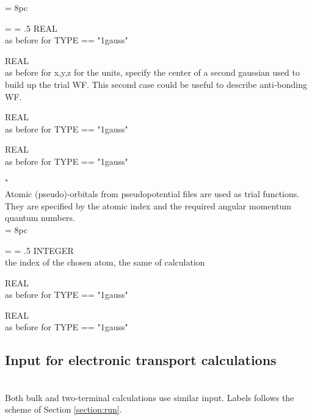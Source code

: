 \newdimen\descindent \descindent = 8pc
{\noindent \leftskip = \descindent \parskip = .5\baselineskip
{}%
REAL \\ as before for TYPE == "1gauss" \par

\noindent{}%
REAL \\ as before for x,y,z for the units, specify the center of a second gaussian
            used to build up the trial WF. This second case could be useful to describe
            anti-bonding WF.\par

\noindent{}%
REAL \\  as before for TYPE == "1gauss" \par

\noindent{}%
REAL \\  as before for TYPE == "1gauss" \par
}
\bigskip

"\\
\noindent Atomic (pseudo)-orbitals from pseudopotential files are used as trial functions. They are
specified by the atomic index and the required angular momentum quantum numbers.\\

\newdimen\descindent \descindent = 8pc
{\noindent \leftskip = \descindent \parskip = .5\baselineskip
{}%
INTEGER \\ the index of the chosen atom, the same of \PWSCF calculation \par

\noindent{}%
REAL \\ as before for TYPE == "1gauss"\par

\noindent{}%
REAL \\  as before for TYPE == "1gauss" \par
}

\subsection{Input for electronic transport calculations}
\\
\noindent Both bulk and two-terminal calculations use similar input. Labels follows the scheme of Section \ref{section:run}.\\

